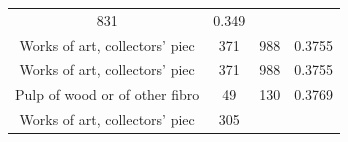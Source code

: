 \documentclass[10pt,]{article}
\begin{document}
\begin{longtable}[]{@{}cccc@{}}
\begin{minipage}[t]{0.20\columnwidth}
831\strut
\end{minipage} & \begin{minipage}[t]{0.09\columnwidth}\centering\strut
0.349\strut
\end{minipage}\tabularnewline
\begin{minipage}[t]{0.38\columnwidth}\centering\strut
Works of art, collectors' piec\strut
\end{minipage} & \begin{minipage}[t]{0.21\columnwidth}\centering\strut
371\strut
\end{minipage} & \begin{minipage}[t]{0.20\columnwidth}\centering\strut
988\strut
\end{minipage} & \begin{minipage}[t]{0.09\columnwidth}\centering\strut
0.3755\strut
\end{minipage}\tabularnewline
\begin{minipage}[t]{0.38\columnwidth}\centering\strut
Works of art, collectors' piec\strut
\end{minipage} & \begin{minipage}[t]{0.21\columnwidth}\centering\strut
371\strut
\end{minipage} & \begin{minipage}[t]{0.20\columnwidth}\centering\strut
988\strut
\end{minipage} & \begin{minipage}[t]{0.09\columnwidth}\centering\strut
0.3755\strut
\end{minipage}\tabularnewline
\begin{minipage}[t]{0.38\columnwidth}\centering\strut
Pulp of wood or of other fibro\strut
\end{minipage} & \begin{minipage}[t]{0.21\columnwidth}\centering\strut
49\strut
\end{minipage} & \begin{minipage}[t]{0.20\columnwidth}\centering\strut
130\strut
\end{minipage} & \begin{minipage}[t]{0.09\columnwidth}\centering\strut
0.3769\strut
\end{minipage}\tabularnewline
\begin{minipage}[t]{0.38\columnwidth}\centering\strut
Works of art, collectors' piec\strut
\end{minipage} & \begin{minipage}[t]{0.21\columnwidth}\centering\strut
305\strut
\end{minipage} & \begin{minipage}[t]{0.20\columnwidth}\centering\strut

\end{minipage}
\end{longtable}
\end{document}
